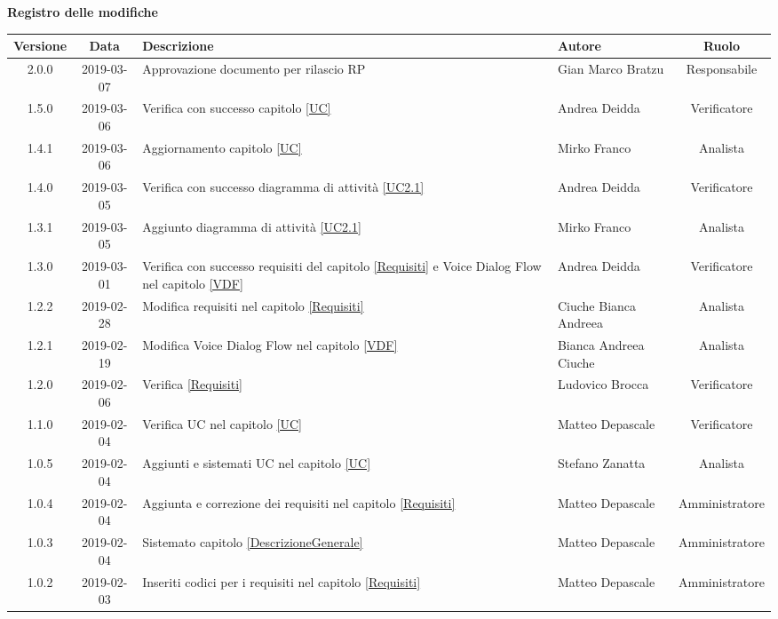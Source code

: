 	\begin{center}
		\textbf{Registro delle modifiche}
	\end{center}
	\begin{center}
		\begin{tabularx}{\textwidth}{|c|c|X|X|c|}
			\hline
			\textbf{Versione} & \textbf{Data} & \textbf{Descrizione} & \textbf{Autore} & \textbf{Ruolo} \\
			\hline
			2.0.0 & 2019-03-07 & Approvazione documento per rilascio RP & Gian Marco Bratzu & Responsabile \\
			\hline
			1.5.0 & 2019-03-06 & Verifica con successo capitolo \cref{UC} &Andrea Deidda & Verificatore \\
			\hline
			1.4.1 & 2019-03-06 & Aggiornamento capitolo \cref{UC} & Mirko Franco & Analista \\
			\hline
			1.4.0 & 2019-03-05 & Verifica con successo diagramma di attività \cref{UC2.1} & Andrea Deidda & Verificatore \\
			\hline
			1.3.1 & 2019-03-05 & Aggiunto diagramma di attività \cref{UC2.1} & Mirko Franco & Analista \\
			\hline
			1.3.0 & 2019-03-01 & Verifica con successo requisiti del capitolo \cref{Requisiti} e Voice Dialog Flow nel capitolo \cref{VDF} & Andrea Deidda & Verificatore \\
			\hline
			1.2.2 & 2019-02-28 & Modifica requisiti nel capitolo \cref{Requisiti}& Ciuche Bianca Andreea & Analista \\
			\hline
			1.2.1 & 2019-02-19 & Modifica Voice Dialog Flow  nel capitolo \cref{VDF} & Bianca Andreea Ciuche & Analista  \\
			\hline
			1.2.0 & 2019-02-06 & Verifica \cref{Requisiti}& Ludovico Brocca & Verificatore \\
			\hline
			1.1.0 & 2019-02-04 & Verifica UC nel capitolo \cref{UC}& Matteo Depascale & Verificatore\\
			\hline
			1.0.5 & 2019-02-04 & Aggiunti e sistemati UC nel capitolo \cref{UC}& Stefano Zanatta & Analista\\
			\hline
			1.0.4 & 2019-02-04 & Aggiunta e correzione dei requisiti nel capitolo \cref{Requisiti}& Matteo Depascale & Amministratore\\
			\hline
			1.0.3 & 2019-02-04 & Sistemato capitolo \cref{DescrizioneGenerale}& Matteo Depascale & Amministratore\\
			\hline
			1.0.2 & 2019-02-03 & Inseriti codici per i requisiti nel capitolo \cref{Requisiti}& Matteo Depascale & Amministratore\\

\end{tabularx}
\end{center}
